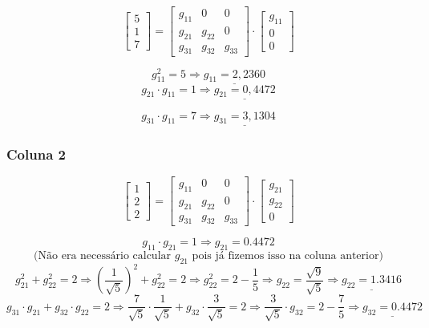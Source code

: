 \documentclass[12pt,a4paper]{article}
\begin{document}
\[
\begin{bmatrix}
5 \\ 1 \\ 7
\end{bmatrix}
=
\begin{bmatrix}
g_{11} & 0 & 0 \\
g_{21} & g_{22} & 0 \\
g_{31} & g_{32} & g_{33}
\end{bmatrix}
\cdot
\begin{bmatrix}
g_{11} \\ 0 \\ 0
\end{bmatrix}
\]

\[
g_{11}^2 = 5 \Rightarrow \underline {g_{11} = 2,2360}
\]
\[
g_{21} \cdot g_{11} = 1 \Rightarrow \underline {g_{21} = 0,4472}
\]

\[
g_{31} \cdot g_{11} = 7 \Rightarrow \underline {g_{31} = 3,1304}
\]

\subsubsection{Coluna 2}

\[
\begin{bmatrix}
1 \\
2 \\
2
\end{bmatrix}
=
\begin{bmatrix}
g_{11} & 0 & 0 \\
g_{21} & g_{22} & 0 \\
g_{31} & g_{32} & g_{33}
\end{bmatrix}
\cdot
\begin{bmatrix}
g_{21} \\
g_{22} \\
0
\end{bmatrix}
\]

\[
g_{11} \cdot g_{21} = 1 \Rightarrow g_{21} = 0.4472
\]
\[
\text{(Não era necessário calcular } g_{21} \text{ pois já fizemos isso na coluna anterior)}
\]
\[
g_{21}^2 + g_{22}^2 = 2 \Rightarrow \left(\frac{1}{\sqrt{5}}\right)^2 + g_{22}^2 = 2 \Rightarrow g_{22}^2 = 2 - \frac{1}{5} \Rightarrow g_{22} = \frac{\sqrt{9}}{\sqrt{5}} \Rightarrow \underline {g_{22} = 1.3416}
\]
\[
g_{31} \cdot g_{21} + g_{32} \cdot g_{22} = 2 \Rightarrow \frac{7}{\sqrt{5}} \cdot \frac{1}{\sqrt{5}} + g_{32} \cdot \frac{3}{\sqrt{5}} = 2 \Rightarrow \frac{3}{\sqrt{5}} \cdot g_{32} = 2 - \frac{7}{5} \Rightarrow \underline {g_{32} = 0.4472}
\]
\end{document}
